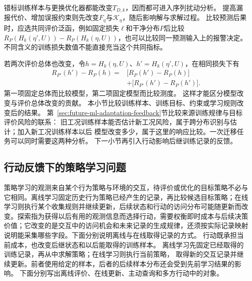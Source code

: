 错标训练样本与更换优化器都能改变$T_{D,k}$，因而都可进入序列扰动分析。
提高漏报代价、增加误报约束则先改变$F_\eta$与$\mathcal K_\eta$，随后影响解与求解过程。
比较预测后果时，应选共同评价泛函，例如固定损失$\ell$和干净分布$P$后比较
$R_P(H_k(\eta',U))-R_P(H_k(\eta,U))$，也可以比较同一预测输入上的报警决定。
不同含义的训练损失数值不能直接充当这个共同指标。

若两次评价总体也改变，令$h=H_k(\eta,U)$、$h'=H_k(\eta',U)$，在相同损失下有
\[
  \begin{aligned}
    R_{P'}(h')-R_P(h)
    ={}&\bigl[R_P(h')-R_P(h)\bigr]\\
       &+\bigl[R_{P'}(h')-R_P(h')\bigr].
  \end{aligned}
\]
第一项固定总体而比较模型，第二项固定模型而比较测度。
这样才能区分模型改变与评价总体改变的贡献。
本小节比较训练样本、训练目标、约束或学习规则改变后的结果。
第~\ref{sec:future-ml-adaptation-feedback}节比较来源训练规律与目标评价风险的联系：
旧工况训练样本能否估计新工况风险，属于跨分布识别与估计；加入新工况训练样本以后
模型改变多少，属于这里的响应比较。一次迁移任务可以同时需要这两种分析。
下一小节再引入行动影响后继训练记录的反馈。

\subsection{行动反馈下的策略学习问题}
\label{sec:future-action-feedback-conditions}

策略学习的观测来自某个行为策略与环境的交互，待评价或优化的目标策略不必与它相同。离线学习固定历史行为策略已经产生的记录，再比较候选目标策略；在线学习则执行某个收集规则并继续更新，后续状态和行动的访问分布可能随更新而改变。探索指为获得以后有用的观测信息而选择行动，需要权衡即时成本与后续决策价值；它改变的是交互中的访问机会和未来记录的生成规律，还须按实际记录映射说明能采集哪些字段。下面分别说明离线与在线取得记录的方式。
行动既承担当前成本，也改变后继状态和以后能取得的训练样本。
离线学习先固定已经取得的训练记录，再从中求解策略；在线学习则执行当前策略，
取得新的交互记录并继续更新。前者使用给定的样本，后者的后续样本分布还会受到先前学习结果的影响。
下面分别写出离线评价、在线更新、主动查询和多方行动中的对象。

